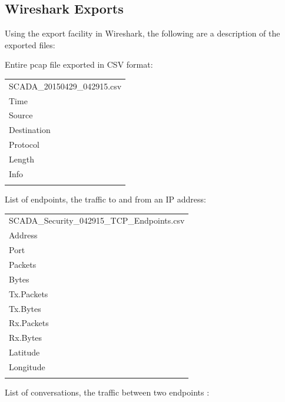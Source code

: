 \documentclass[12pt,]{article}
\begin{document}
\subsection*{Wireshark Exports}\label{wireshark-exports}

Using the export facility in Wireshark, the following are a description
of the exported files:

Entire pcap file exported in CSV format:

\begin{longtable}[c]{@{}l@{}}
\toprule\addlinespace
SCADA\_20150429\_042915.csv
\\\addlinespace
\midrule\endhead
Time
\\\addlinespace
Source
\\\addlinespace
Destination
\\\addlinespace
Protocol
\\\addlinespace
Length
\\\addlinespace
Info
\\\addlinespace
\bottomrule
\end{longtable}

List of endpoints, the traffic to and from an IP address:

\begin{longtable}[c]{@{}l@{}}
\toprule\addlinespace
SCADA\_Security\_042915\_TCP\_Endpoints.csv
\\\addlinespace
\midrule\endhead
Address
\\\addlinespace
Port
\\\addlinespace
Packets
\\\addlinespace
Bytes
\\\addlinespace
Tx.Packets
\\\addlinespace
Tx.Bytes
\\\addlinespace
Rx.Packets
\\\addlinespace
Rx.Bytes
\\\addlinespace
Latitude
\\\addlinespace
Longitude
\\\addlinespace
\bottomrule
\end{longtable}

List of conversations, the traffic between two endpoints :
\end{document}
